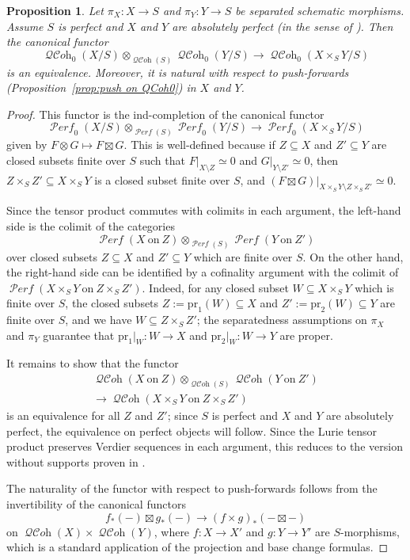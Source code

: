 \documentclass[12pt, oneside]{amsart}
\numberwithin{equation}{section}
\newtheorem{proposition}[subsubsection]{Proposition}
\theoremstyle{remark}
\theoremstyle{plain}
\DeclareMathOperator{\QCOH}{\mathcal{QC}\textit{oh}}
\DeclareMathOperator{\PERF}{\mathcal{P}\textit{erf}}
\begin{document}
\begin{proposition}\label{prop:QCOH0Kunneth}
  Let $\pi_X: X \to S$ and $\pi_Y: Y \to S$ be separated schematic morphisms.
  Assume $S$ is perfect and $X$ and $Y$ are absolutely perfect (in the sense of \cite[Def.~1.47]{KhanKstack}).
  Then the canonical functor
  \[ \QCOH_0(X/S) \otimes_{\QCOH(S)} \QCOH_0(Y/S) \to \QCOH_{0}(X \times_S Y/S) \]
  is an equivalence.
  Moreover, it is natural with respect to push-forwards (Proposition~\ref{prop:push on QCoh0}) in $X$ and $Y$.
\end{proposition}
\begin{proof}
  This functor is the ind-completion of the canonical functor
  \[ \PERF_0(X/S) \otimes_{\PERF(S)} \PERF_0(Y/S) \to \PERF_{0}(X \times_S Y/S) \]
  given by $F \otimes G \mapsto F \boxtimes G$.
  This is well-defined because if $Z \subseteq X$ and $Z' \subseteq Y$ are closed subsets finite over $S$ such that $F|_{X\setminus Z} \simeq 0$ and $G|_{Y\setminus Z'} \simeq 0$, then $Z\times_S Z' \subseteq X\times_S Y$ is a closed subset finite over $S$, and $(F \boxtimes G)|_{X\times_S Y \setminus Z\times_S Z'} \simeq 0$.

  Since the tensor product commutes with colimits in each argument, the left-hand side is the colimit of the categories
  \[ \PERF(X~\mathrm{on}~Z) \otimes_{\PERF(S)} \PERF(Y~\mathrm{on}~Z') \]
  over closed subsets $Z \subseteq X$ and $Z' \subseteq Y$ which are finite over $S$.
  On the other hand, the right-hand side can be identified by a cofinality argument with the colimit of $\PERF(X \times_S Y~\mathrm{on}~Z\times_S Z')$.
  Indeed, for any closed subset $W \subseteq X \times_S Y$ which is finite over $S$, the closed subsets $Z := \mathrm{pr}_1(W) \subseteq X$ and $Z' := \mathrm{pr}_2(W) \subseteq Y$ are finite over $S$, and we have $W \subseteq Z \times_S Z'$; the separatedness assumptions on $\pi_X$ and $\pi_Y$ guarantee that $\mathrm{pr}_1|_W : W \to X$ and $\mathrm{pr}_2|_W : W \to Y$ are proper.

  It remains to show that the functor
  \[\begin{multlined}
    \QCOH(X~\mathrm{on}~Z) \otimes_{\QCOH(S)} \QCOH(Y~\mathrm{on}~Z')\\
    \to \QCOH(X \times_S Y~\mathrm{on}~Z \times_S Z')
  \end{multlined}\]
  is an equivalence for all $Z$ and $Z'$; since $S$ is perfect and $X$ and $Y$ are absolutely perfect, the equivalence on perfect objects will follow.
  Since the Lurie tensor product preserves Verdier sequences in each argument, this reduces to the version without supports proven in \cite[Thm.~1.2(i)]{BFN}.

  The naturality of the functor with respect to push-forwards follows from the invertibility of the canonical functors
  \[ f_*(-) \boxtimes g_*(-) \to (f \times g)_*(- \boxtimes -) \]
  on $\QCOH(X) \times \QCOH(Y)$, where $f : X \to X'$ and $g : Y \to Y'$ are $S$-morphisms, which is a standard application of the projection and base change formulas.
\end{proof}
\end{document}
